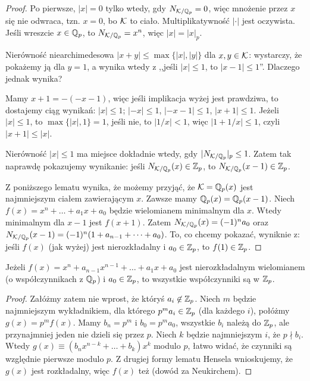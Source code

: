 \begin{proof}
	Po pierwsze, $|x| = 0$ tylko wtedy, gdy $N_{\mathcal K / \mathbb Q_p} = 0$, więc mnożenie przez $x$ się nie odwraca, tzn. $x = 0$, bo $\mathcal K$ to ciało.
	Multiplikatywność $|\cdot |$ jest oczywista.
	Jeśli wreszcie $ x \in \mathbb Q_p$, to $N_{\mathcal K/\mathbb Q_p} = x^n$, więc $|x| = |x|_p$.

	Nierówność niearchimedesowa $|x+y| \le \max\{|x|, |y|\}$ dla $x, y \in \mathcal K$: wystarczy, że pokażemy ją dla $y = 1$, a wynika wtedy z ,,jeśli $|x| \le 1$, to $|x-1| \le 1$''.
	Dlaczego jednak wynika?

	Mamy $x + 1 = -(-x-1)$, więc jeśli implikacja wyżej jest prawdziwa, to dostajemy ciąg wynikań: $|x| \le 1$; $|{-x}| \le 1$, $|{-x}-1| \le 1$, $|x+1| \le 1$.
	Jeżeli $|x| \le 1$, to $\max\{|x|, 1\} = 1$, jeśli nie, to $|1/x| < 1$, więc $|1+1/x| \le 1$, czyli $|x+1| \le |x|$.

	Nierówność $|x| \le 1$ ma miejsce dokładnie wtedy, gdy $|N_{\mathcal K / \mathbb Q_p}|_p \le 1$.
	Zatem tak naprawdę pokazujemy wynikanie: jeśli $N_{\mathcal K/\mathbb Q_p}(x) \in \mathbb Z_p$, to $N_{\mathcal K/\mathbb Q_p}(x-1) \in \mathbb Z_p$.

	Z poniższego lematu wynika, że możemy przyjąć, że $\mathcal K = \mathbb Q_p(x)$ jest najmniejszym ciałem zawierającym $x$.
	Zawsze mamy $\mathbb Q_p(x) = \mathbb Q_p(x-1)$.
	Niech $f(x) = x^n + \ldots + a_1 x + a_0$ będzie wielomianem minimalnym dla $x$.
	Wtedy minimalnym dla $x-1$ jest $f(x+1)$.
	Zatem $N_{\mathcal K/\mathbb Q_p}(x) = (-1)^n a_0$ oraz $N_{\mathcal K/\mathbb Q_p}(x-1) = (-1)^n(1 + a_{n-1} + \dots + a_0)$.
	To, co chcemy pokazać, wyniknie z: jeśli $f(x)$ (jak wyżej) jest nierozkładalny i $a_0 \in \mathbb Z_p$, to $f(1) \in \mathbb Z_p$.
\end{proof}

\begin{lemat}
	Jeżeli $f(x) = x^n + a_{n-1}x^{n-1} + \dots + a_1x  + a_0$ jest nierozkładalnym wielomianem (o współczynnikach z $\mathbb Q_p$) i $a_0 \in \mathbb Z_p$, to wszystkie współczynniki są w $\mathbb Z_p$.
\end{lemat}

\begin{proof}
	Załóżmy zatem nie wprost, że któryś $a_i \not \in \mathbb Z_p$.
	Niech $m$ będzie najmniejszym wykładnikiem, dla którego $p^ma_i \in \mathbb Z_p$ (dla każdego $i$), połóżmy $g(x) = p^mf(x)$.
	Mamy $b_n = p^m$ i $b_0 = p^m a_0$, wszystkie $b_i$ należą do $\mathbb Z_p$, ale przynajmniej jeden nie dzieli się przez $p$.
	Niech $k$ będzie najmniejszym $i$, że $p \nmid b_i$.
	Wtedy $g(x) \equiv (b_nx^{n-k} + \dots + b_k) x^k$ modulo $p$, łatwo widać, że czynniki są względnie pierwsze modulo $p$.
	Z drugiej formy lematu Hensela wnioskujemy, że $g(x)$ jest rozkładalny, więc $f(x)$ też (dowód za Neukirchem).
\end{proof}

